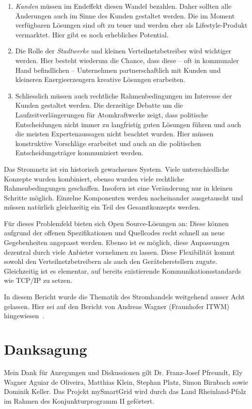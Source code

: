 \documentclass[12pt,BCOR=8.5mm]{scrartcl}
\begin{document}
\begin{enumerate}
  \item \emph{Kunden} müssen im Endeffekt diesen Wandel bezahlen. Daher
    sollten alle Änderungen auch im Sinne des Kunden gestaltet werden.
    Die im Moment verfügbaren Lösungen sind oft zu teuer und werden eher
    als Lifestyle-Produkt vermarktet. Hier gibt es noch erhebliches
    Potential.
  \item Die Rolle der \emph{Stadtwerke} und kleinen Verteilnetzbetreiber
    wird wichtiger werden. Hier besteht wiederum die Chance, dass diese
    -- oft in kommunaler Hand befindlichen -- Unternehmen
    partnerschaftlich mit Kunden und kleineren Energieerzeugern kreative
    Lösungen erarbeiten.
  \item Schliesslich müssen auch rechtliche Rahmenbedingungen im
    Interesse der Kunden gestaltet werden. Die derzeitige Debatte um die
    Laufzeitverlängerungen für Atomkraftwerke zeigt, dass politische
    Entscheidungen nicht immer zu langfristig guten Lösungen führen und
    auch die meisten Expertenaussagen nicht beachtet wurden. Hier müssen
    konstruktive Vorschläge erarbeitet und auch an die politischen
    Entscheidungsträger kommuniziert werden.
\end{enumerate}

Das Stromnetz ist ein historisch gewachsenes System. Viele
unterschiedliche Konzepte wurden kombiniert, ebenso wurden viele
rechtliche Rahmenbedingungen geschaffen. Insofern ist eine Veränderung
nur in kleinen Schritte möglich. Einzelne Komponenten werden
nacheinander ausgetauscht und müssen natürlich gleichzeitig ein Teil des
Gesamtkonzepts werden.

Für dieses Problemfeld bieten sich Open Source-Lösungen an: Diese können
aufgrund der offenen Spezifikationen und Quellcodes recht schnell an
neue Gegebenheiten angepasst werden. Ebenso ist es möglich, diese
Anpassungen dezentral durch viele Anbieter vornehmen zu lassen. Diese
Flexibilität kommt sowohl den Verteilnetzbetreibern als auch den
Geräteherstellern zugute. Gleichzeitig ist es elementar, auf bereits
existierende Kommunikationsstandards wie TCP/IP zu setzen.

In diesem Bericht wurde die Thematik des Stromhandels weitgehend
ausser Acht gelassen. Hier sei auf den Bericht von Andreas Wagner
(Fraunhofer ITWM) hingewiesen~\cite{wagner11market}.

\section*{Danksagung}\label{danksagung}
Mein Dank für Anregungen und Diskussionen gilt Dr. Franz-Josef Pfreundt,
Ely Wagner Aguiar de Oliveira, Matthias Klein, Stephan Platz, Simon
Birnbach sowie Dominik Keller. Das Projekt mySmartGrid wird durch das
Land Rheinland-Pfalz im Rahmen des Konjunkturprogramm II geförtert.



\end{document}
